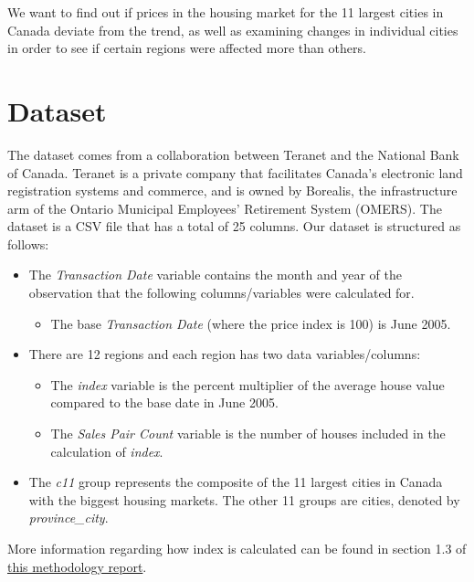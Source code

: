 \documentclass{article}
\begin{document}
We want to find out if prices in the housing market for the 11 largest cities in Canada deviate from the trend, as well as examining changes in individual cities in order to see if certain regions were affected more than others.

\section{Dataset}

The dataset comes from a collaboration between Teranet and the National Bank of Canada. Teranet is a private company that facilitates Canada's electronic land registration systems and commerce, and is owned by Borealis, the infrastructure arm of the Ontario Municipal Employees' Retirement System (OMERS).
\noindent The dataset is a CSV file that has a total of 25 columns. Our dataset is structured as follows:
\begin{itemize}
\item The \textit{Transaction Date} variable contains the month and year of the observation that the following columns/variables were calculated for.
\begin{itemize}
\item The base \textit{Transaction Date} (where the price index is 100) is June 2005.
\end{itemize}
\item There are 12 regions and each region has two data variables/columns:
\begin{itemize}
    \item The \textit{index} variable is the percent multiplier of the average house value compared to the base date in June 2005.
    \item The \textit{Sales Pair Count} variable is the number of houses included in the calculation of \textit{index}.
\end{itemize}
\item The \textit{c11} group represents the composite of the 11 largest cities in Canada with the biggest housing markets. The other 11 groups are cities, denoted by \textit{province\_city}.

\end{itemize}
  More information regarding how index is calculated can be found in section 1.3 of \href{https://housepriceindex.ca/wp-content/uploads/2017/08/Teranet-National-Bank-House-Price-Index-Methodology-Overview.pdf}{this methodology report}.
\end{document}
